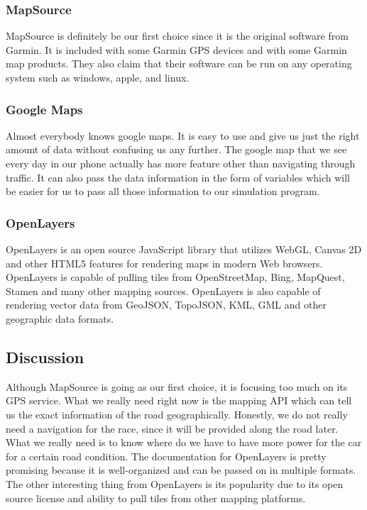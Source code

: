 \documentclass[onecolumn, draftclsnofoot,10pt, compsoc]{IEEEtran}
\begin{document}
\begin{singlespace}
\subsubsection{MapSource}
MapSource is definitely be our first choice since it is the original software from Garmin. It is included with some Garmin GPS devices and with some Garmin map products. They also claim that their software can be run on any operating system such as windows, apple, and linux.  

\subsubsection{Google Maps}
Almost everybody knows google maps. It is easy to use and give us just the right amount of data without confusing us any further. The google map that we see every day in our phone actually has more feature other than navigating through traffic. It can also pass the data information in the form of variables which will be easier for us to pass all those information to our simulation program. 

\subsubsection{OpenLayers}
OpenLayers is an open source JavaScript library that utilizes WebGL, Canvas 2D and other HTML5 features for rendering maps in modern Web browsers. OpenLayers is capable of pulling tiles from OpenStreetMap, Bing, MapQuest, Stamen and many other mapping sources. OpenLayers is also capable of rendering vector data from GeoJSON, TopoJSON, KML, GML and other geographic data formats.

\subsection{Discussion}
Although MapSource is going as our first choice, it is focusing too much on its GPS service. What we really need right now is the mapping API which can tell us the exact information of the road geographically. Honestly, we do not really need a navigation for the race, since it will be provided along the road later. What we really need is to know where do we have to have more power for the car for a certain road condition. The documentation for OpenLayers is pretty promising because it is well-organized and can be passed on in multiple formats. The other interesting thing from OpenLayers is its popularity due to its open source license and ability to pull tiles from other mapping platforms. 


\end{singlespace}
\end{document}

